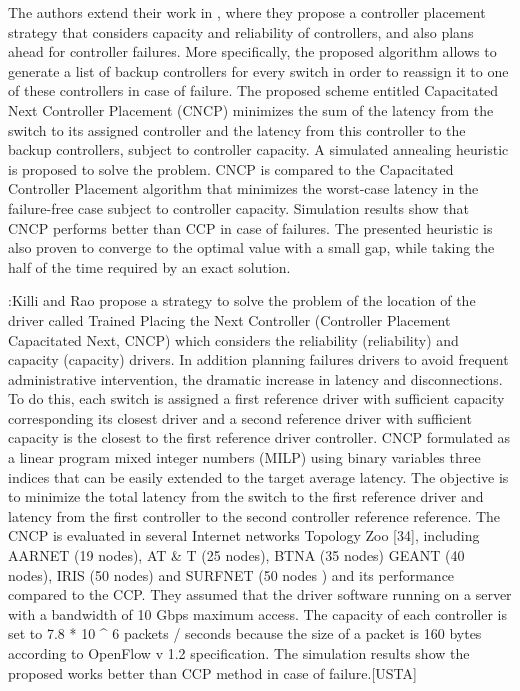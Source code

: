 \documentclass[a4paper,10pt]{article}
\begin{document}
The authors extend their work in \cite{KiRa17}, where they propose a controller placement strategy that considers capacity and reliability of controllers, and also plans ahead for controller failures. More specifically, the proposed algorithm allows to generate a list of backup controllers for every switch in order to reassign it to one of these controllers in case of failure. The proposed scheme entitled Capacitated Next Controller Placement (CNCP) minimizes the sum of the latency from the switch to its assigned controller and the latency from this controller to the backup controllers, subject to controller capacity. A simulated annealing heuristic is proposed to solve the problem. CNCP is compared to the Capacitated Controller Placement algorithm that minimizes the worst-case latency in the failure-free case subject to controller capacity. Simulation results show that CNCP performs better than CCP in case of failures. The presented heuristic is also proven to converge to the optimal value with a small gap, while taking the half of the time required by an exact solution. 



\cite{KiRa17}:Killi and Rao propose a strategy to solve the problem of the location of the driver called Trained Placing the Next Controller (Controller Placement Capacitated Next, CNCP) which considers the reliability (reliability) and capacity (capacity) drivers. In addition planning failures drivers to avoid frequent administrative intervention, the dramatic increase in latency and disconnections. To do this, each switch is assigned a first reference driver with sufficient capacity corresponding its closest driver and a second reference driver with sufficient capacity is the closest to the first reference driver controller. CNCP formulated as a linear program mixed integer numbers (MILP) using binary variables three indices that can be easily extended to the target average latency. The objective is to minimize the total latency from the switch to the first reference driver and latency from the first controller to the second controller reference reference.
The CNCP is evaluated in several Internet networks Topology Zoo [34], including AARNET (19 nodes), AT & T (25 nodes), BTNA (35 nodes) GEANT (40 nodes), IRIS (50 nodes) and SURFNET (50 nodes ) and its performance compared to the CCP.
They assumed that the driver software running on a server with a bandwidth of 10 Gbps maximum access. The capacity of each controller is set to 7.8 * 10 ^ 6 packets / seconds because the size of a packet is 160 bytes according to OpenFlow 
v 1.2 specification.
The simulation results show the proposed works better than CCP method in case of failure.[USTA]
\end{document}

